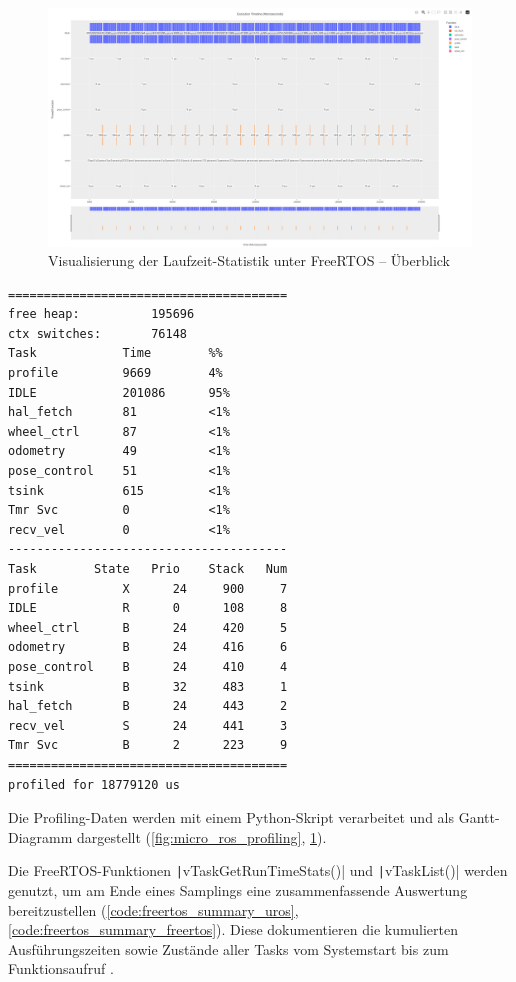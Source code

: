 \begin{figure}[h]
    \centering
    \includegraphics[width=1\textwidth]{assets/freertos_profiling}
    \caption{Visualisierung der Laufzeit-Statistik unter FreeRTOS -- Überblick}
    \label{fig:freertos_profiling}
\end{figure}

\begin{code}
\begin{verbatim}
=======================================
free heap:          195696
ctx switches:       76148
Task            Time        %%
profile         9669        4%
IDLE            201086      95%
hal_fetch       81          <1%
wheel_ctrl      87          <1%
odometry        49          <1%
pose_control    51          <1%
tsink           615         <1%
Tmr Svc         0           <1%
recv_vel        0           <1%
---------------------------------------
Task        State   Prio    Stack   Num
profile         X      24     900     7
IDLE            R      0      108     8
wheel_ctrl      B      24     420     5
odometry        B      24     416     6
pose_control    B      24     410     4
tsink           B      32     483     1
hal_fetch       B      24     443     2
recv_vel        S      24     441     3
Tmr Svc         B      2      223     9
=======================================
profiled for 18779120 us
\end{verbatim}
    \label{code:freertos_summary_freertos}
\end{code}

Die Profiling-Daten werden mit einem Python-Skript verarbeitet und als
Gantt-Diagramm dargestellt (\ref{fig:micro_ros_profiling},
\ref{fig:freertos_profiling}).

Die FreeRTOS-Funktionen \texttt|vTaskGetRunTimeStats()| und
\texttt|vTaskList()| werden genutzt, um am Ende eines Samplings eine
zusammenfassende Auswertung bereitzustellen
(\ref{code:freertos_summary_uros}, \ref{code:freertos_summary_freertos}). Diese
dokumentieren die kumulierten Ausführungszeiten sowie Zustände aller Tasks vom
Systemstart bis zum Funktionsaufruf \cite{freertos_runtime_stats}.

